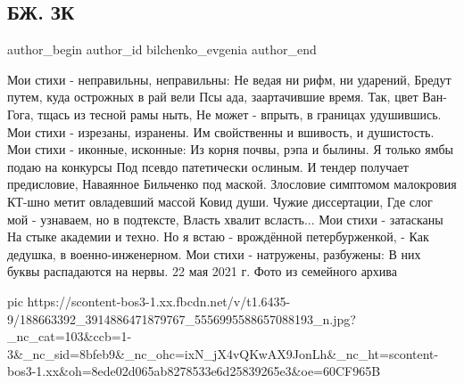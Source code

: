  
 
 
 
 
 
\subsection{БЖ. ЗК}
\label{sec:22_05_2021.fb.bilchenko_evgenia.2.zk}
\ifcmt
 author_begin
   author_id bilchenko_evgenia
 author_end
\fi

Мои стихи - неправильны, неправильны:
Не ведая ни рифм, ни ударений,
Бредут путем, куда острожных в рай вели
Псы ада, заартачившие время.
Так, цвет Ван-Гога, тщась из тесной рамы ныть,
Не может - впрыть, в границах удушившись.
Мои стихи - изрезаны, изранены.
Им свойственны и вшивость, и душистость.
Мои стихи - иконные, исконные:
Из корня почвы, рэпа и былины.
Я только ямбы подаю на конкурсы
Под псевдо патетически ослиным.
И тендер получает предисловие,
Наваянное Бильченко под маской.
Злословие симптомом малокровия
КТ-шно метит овладевший массой
Ковид души. Чужие диссертации,
Где слог мой - узнаваем, но в подтексте,
Власть хвалит всласть... Мои стихи - затасканы
На стыке академии и техно.
Но я встаю - врождённой петербурженкой, -
Как дедушка, в военно-инженерном.
Мои стихи - натружены, разбужены:
В них буквы распадаются на нервы.
22 мая 2021 г.
Фото из семейного архива


\ifcmt
  pic https://scontent-bos3-1.xx.fbcdn.net/v/t1.6435-9/188663392_3914886471879767_5556995588657088193_n.jpg?_nc_cat=103&ccb=1-3&_nc_sid=8bfeb9&_nc_ohc=ixN_jX4vQKwAX9JonLh&_nc_ht=scontent-bos3-1.xx&oh=8ede02d065ab8278533e6d25839265e3&oe=60CF965B
\fi

